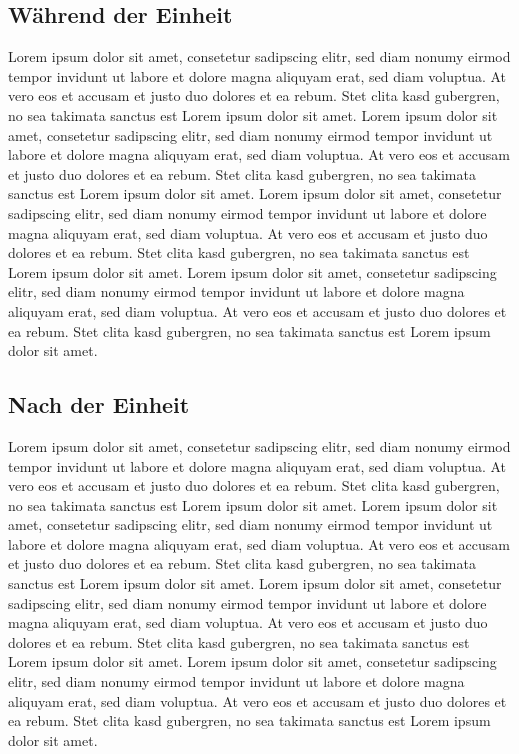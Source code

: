 \documentclass[a4paper,11pt]{scrartcl} %
\begin{document}
  \subsection{Während der Einheit} %
Lorem ipsum dolor sit amet, consetetur sadipscing elitr, sed diam nonumy 
eirmod tempor invidunt ut labore et dolore magna aliquyam erat, sed diam 
voluptua. At vero eos et accusam et justo duo dolores et ea rebum. Stet 
clita kasd gubergren, no sea takimata sanctus est Lorem ipsum dolor sit 
amet. Lorem ipsum dolor sit amet, consetetur sadipscing elitr, sed diam 
nonumy eirmod tempor invidunt ut labore et dolore magna aliquyam erat, 
sed diam voluptua. At vero eos et accusam et justo duo dolores et ea rebum. 
Stet clita kasd gubergren, no sea takimata sanctus est Lorem ipsum dolor sit 
amet.
Lorem ipsum dolor sit amet, consetetur sadipscing elitr, sed diam nonumy 
eirmod tempor invidunt ut labore et dolore magna aliquyam erat, sed diam 
voluptua. At vero eos et accusam et justo duo dolores et ea rebum. Stet 
clita kasd gubergren, no sea takimata sanctus est Lorem ipsum dolor sit 
amet. Lorem ipsum dolor sit amet, consetetur sadipscing elitr, sed diam 
nonumy eirmod tempor invidunt ut labore et dolore magna aliquyam erat, 
sed diam voluptua. At vero eos et accusam et justo duo dolores et ea rebum. 
Stet clita kasd gubergren, no sea takimata sanctus est Lorem ipsum dolor sit 
amet.

  \subsection{Nach der Einheit} %
Lorem ipsum dolor sit amet, consetetur sadipscing elitr, sed diam nonumy 
eirmod tempor invidunt ut labore et dolore magna aliquyam erat, sed diam 
voluptua. At vero eos et accusam et justo duo dolores et ea rebum. Stet 
clita kasd gubergren, no sea takimata sanctus est Lorem ipsum dolor sit 
amet. Lorem ipsum dolor sit amet, consetetur sadipscing elitr, sed diam 
nonumy eirmod tempor invidunt ut labore et dolore magna aliquyam erat, 
sed diam voluptua. At vero eos et accusam et justo duo dolores et ea rebum. 
Stet clita kasd gubergren, no sea takimata sanctus est Lorem ipsum dolor sit 
amet.
Lorem ipsum dolor sit amet, consetetur sadipscing elitr, sed diam nonumy 
eirmod tempor invidunt ut labore et dolore magna aliquyam erat, sed diam 
voluptua. At vero eos et accusam et justo duo dolores et ea rebum. Stet 
clita kasd gubergren, no sea takimata sanctus est Lorem ipsum dolor sit 
amet. Lorem ipsum dolor sit amet, consetetur sadipscing elitr, sed diam 
nonumy eirmod tempor invidunt ut labore et dolore magna aliquyam erat, 
sed diam voluptua. At vero eos et accusam et justo duo dolores et ea rebum. 
Stet clita kasd gubergren, no sea takimata sanctus est Lorem ipsum dolor sit 
amet.
\end{document}
